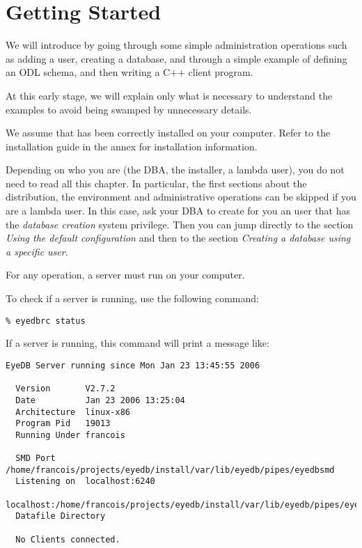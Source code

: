 

\newcommand{\mantitle}{\textsc{Getting Started}}


\tableofcontents

\chapter*{Getting Started}


We will introduce \eyedb by going through some simple administration
operations such as adding a user, creating a database, and through
a simple example of defining an ODL schema, and then writing a C++
client program.

At this early stage, we will explain only what is necessary to understand
the examples to avoid being swamped by unnecessary details.

We assume that \eyedb has been correctly installed on your
computer.
Refer to the installation guide in the annex for installation information.

Depending on who you are (the DBA, the installer, a lambda user), you do not need
to read all this chapter. In particular, the first sections about the
distribution, the environment and administrative operations 
can be skipped if you are a lambda user. In this case, ask your DBA to create
for you an \eyedb user that has the \emph{database creation} system privilege. 
Then you can jump directly to the section
\emph{Using the default configuration} and then to the section
\emph{Creating a database using a specific user}.







For any \eyedb operation, a server must run on your computer.

To check if a server is running, use the following command:
\verbsize \begin{verbatim}
% eyedbrc status
\end{verbatim}
\normalsize
If a server is running, this command will print a message like:
\verbsize \begin{verbatim}
EyeDB Server running since Mon Jan 23 13:45:55 2006

  Version       V2.7.2
  Date          Jan 23 2006 13:25:04
  Architecture  linux-x86
  Program Pid   19013
  Running Under francois

  SMD Port      /home/francois/projects/eyedb/install/var/lib/eyedb/pipes/eyedbsmd
  Listening on  localhost:6240
                localhost:/home/francois/projects/eyedb/install/var/lib/eyedb/pipes/eyedbd
  Datafile Directory 

  No Clients connected.
\end{verbatim}
\normalsize

